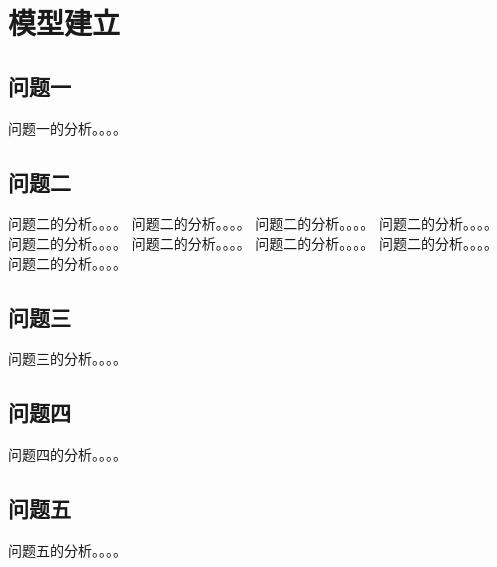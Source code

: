 \section{模型建立}    
    \subsection{问题一}
        问题一的分析。。。。
    \subsection{问题二}
        问题二的分析。。。。
        问题二的分析。。。。
        问题二的分析。。。。
        问题二的分析。。。。
        问题二的分析。。。。
        问题二的分析。。。。
        问题二的分析。。。。
        问题二的分析。。。。
        问题二的分析。。。。
    \subsection{问题三}
        问题三的分析。。。。
    \subsection{问题四}
        问题四的分析。。。。
    \subsection{问题五}
        问题五的分析。。。。    